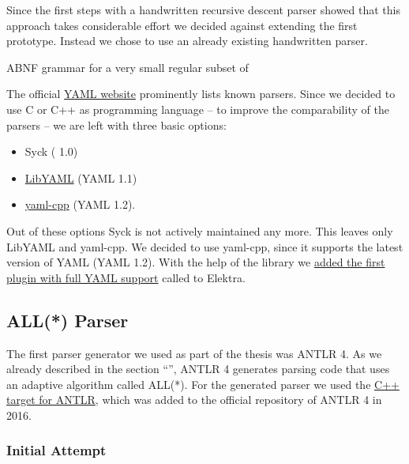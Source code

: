 Since the first steps with a handwritten recursive descent parser showed that this approach takes considerable effort we decided against extending the first prototype. Instead we chose to use an already existing handwritten  parser.

\begin{listing}
  \centering
  \begin{code-boxed}
    
  \end{code-boxed}
  \caption{ABNF grammar for a very small regular subset of }
  \label{cod:abnf_recurive_descent}
\end{listing}

The official \href{http://yaml.org}{YAML website} prominently lists known  parsers. Since we decided to use C or C++ as programming language – to improve the comparability of the parsers – we are left with three basic options:

\begin{itemize}
  \item Syck ( 1.0)
  \item \href{https://github.com/yaml/libyaml}{LibYAML} (YAML 1.1)
  \item \href{https://github.com/jbeder/yaml-cpp}{yaml-cpp} (YAML 1.2).
\end{itemize}

Out of these options Syck is not actively maintained any more. This leaves only LibYAML and yaml-cpp. We decided to use yaml-cpp, since it supports the latest version of YAML (YAML 1.2). With the help of the library we \href{https://github.com/ElektraInitiative/libelektra/pull/1613}{added the first plugin with full YAML support} called \LinkYAMLCPP{} to Elektra.

\subsection{ALL(*) Parser}

The first parser generator we used as part of the thesis was \gls{ANTLR} 4. As we already described in the section “”, \gls{ANTLR} 4 generates parsing code that uses an adaptive  algorithm called ALL(*). For the generated parser we used the \href{https://github.com/antlr/antlr4/pull/1210}{C++ target for ANTLR}, which was added to the official repository of \gls{ANTLR} 4 in 2016.

\subsubsection{Initial Attempt}

